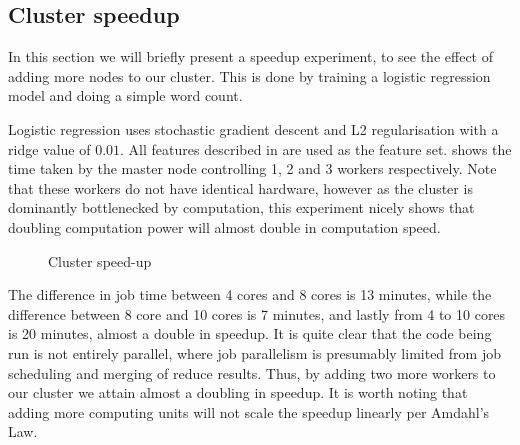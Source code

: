 \subsection{Cluster speedup}\label{sec:speedup}
In this section we will briefly present a speedup experiment, to see the effect of adding more nodes to our cluster. This is done by training a logistic regression model and doing a simple word count. 

Logistic regression uses stochastic gradient descent and L2 regularisation with a ridge value of $0.01$. All features described in  are used as the feature set.  shows the time taken by the master node controlling 1, 2 and 3 workers respectively. Note that these workers do not have identical hardware, however as the cluster is dominantly bottlenecked by computation, this experiment nicely shows that doubling computation power will almost double in computation speed.


\begin{figure}[!htb]
  \centering
   \caption{Cluster speed-up}\label{fig:cluster-speedup}
\end{figure}
The difference in job time between 4 cores and 8 cores is 13 minutes, while the difference between 8 core and 10 cores is 7 minutes, and lastly from 4 to 10 cores is 20 minutes, almost a double in speedup. It is quite clear that the code being run is not entirely parallel, where job parallelism is presumably limited from job scheduling and merging of reduce results. Thus, by adding two more workers to our cluster we attain almost a doubling in speedup. It is worth noting that adding more computing units will not scale the speedup linearly per Amdahl's Law.

